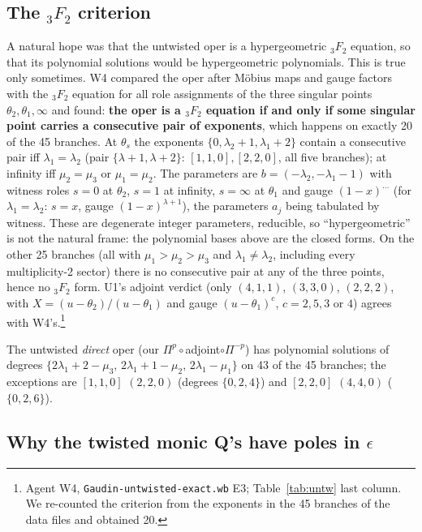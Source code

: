 \documentclass[11pt]{article}
\begin{document}
\subsection{The \texorpdfstring{${}_3F_2$}{F} criterion}\label{sec:3F2}

A natural hope was that the untwisted oper is a hypergeometric ${}_3F_2$ equation, so that its polynomial solutions would be hypergeometric polynomials.
This is true only sometimes.
W4 compared the oper after Möbius maps and gauge factors with the ${}_3F_2$ equation for all role assignments of the three singular points $\theta_2,\theta_1,\infty$ and found: \textbf{the oper is a ${}_3F_2$ equation if and only if some singular point carries a consecutive pair of exponents}, which happens on exactly 20 of the 45 branches.
At $\theta_s$ the exponents $\{0,\lambda_2+1,\lambda_1+2\}$ contain a consecutive pair iff $\lambda_1=\lambda_2$ (pair $\{\lambda+1,\lambda+2\}$: $[1,1,0],[2,2,0]$, all five branches); at infinity iff $\mu_2=\mu_3$ or $\mu_1=\mu_2$. The parameters are $b=(-\lambda_2,-\lambda_1-1)$ with witness roles $s=0$ at $\theta_2$, $s=1$ at infinity, $s=\infty$ at $\theta_1$ and gauge $(1-x)^{\ldots}$ (for $\lambda_1=\lambda_2$: $s=x$, gauge $(1-x)^{\lambda+1}$), the parameters $a_j$ being tabulated by witness.
These are degenerate integer parameters, reducible, so ``hypergeometric'' is not the natural frame: the polynomial bases above are the closed forms.
On the other 25 branches (all with $\mu_1>\mu_2>\mu_3$ and $\lambda_1\ne\lambda_2$, including every multiplicity-2 sector) there is no consecutive pair at any of the three points, hence no ${}_3F_2$ form.
U1's adjoint verdict (only $(4,1,1)$, $(3,3,0)$, $(2,2,2)$, with $X=(u-\theta_2)/(u-\theta_1)$ and gauge $(u-\theta_1)^c$, $c=2,5,3$ or $4$) agrees with W4's.\footnote{Agent W4, \texttt{Gaudin-\allowbreak{}untwisted-\allowbreak{}exact.\allowbreak{}wb} E3; Table~\ref{tab:untw} last column.
We re-counted the criterion from the exponents in the 45 branches of the data files and obtained 20.}

The untwisted \emph{direct} oper (our $\Pi^p\circ$adjoint$\circ\Pi^{-p}$) has polynomial solutions of degrees $\{2\lambda_1+2-\mu_3,\,2\lambda_1+1-\mu_2,\,2\lambda_1-\mu_1\}$ on 43 of the 45 branches; the exceptions are $[1,1,0]$ $(2,2,0)$ (degrees $\{0,2,4\}$) and $[2,2,0]$ $(4,4,0)$ ($\{0,2,6\}$).

\subsection{Why the twisted monic Q's have poles in \texorpdfstring{$\epsilon$}{}}\label{sec:poles}
\end{document}
